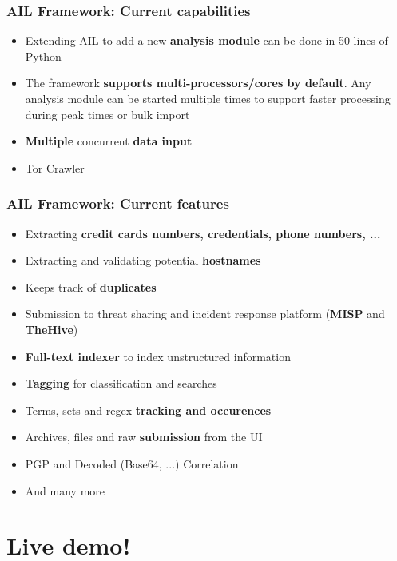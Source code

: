 \begin{frame}
    \frametitle{AIL Framework: Current capabilities}
    \begin{itemize}
        \item Extending AIL to add a new {\bf analysis module} can be done in 50 lines of Python
        \item The framework {\bf supports multi-processors/cores by default}. Any analysis module can be started multiple times to support faster processing during peak times or bulk import
        \item \textbf{Multiple} concurrent \textbf{data input}
        \item Tor Crawler
    \end{itemize}
\end{frame}

\begin{frame}
    \frametitle{AIL Framework: Current features}
    \begin{itemize}
        \item Extracting \textbf{credit cards numbers, credentials, phone numbers, ...}
        \item Extracting and validating potential \textbf{hostnames}
        \item Keeps track of \textbf{duplicates}
        \item Submission to threat sharing and incident response platform (\textbf{MISP} and \textbf{TheHive})
        \item \textbf{Full-text indexer} to index unstructured information
        \item \textbf{Tagging} for classification and searches
        \item Terms, sets and regex \textbf{tracking and occurences}
        \item Archives, files and raw \textbf{submission} from the UI
        \item PGP and Decoded (Base64, ...) Correlation
        \item And many more
    \end{itemize}
\end{frame}

\section{Live demo!}

